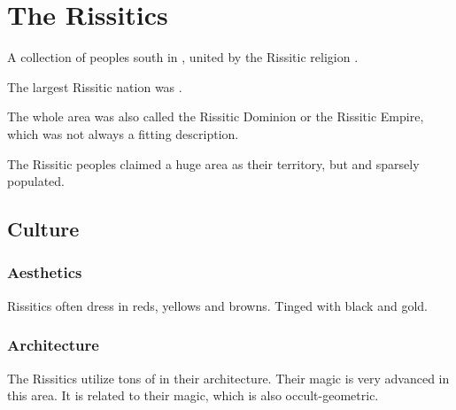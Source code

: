 \chapter{The Rissitics}
\index{\Durcac}
A collection of peoples south in , united by the Rissitic religion . 

The largest Rissitic nation was \Durcac. 

The whole area was also called the Rissitic Dominion or the Rissitic Empire, which was not always a fitting description.

The Rissitic peoples claimed a huge area as their territory, but  and sparsely populated. 















\section{Culture}









\subsection{Aesthetics}
Rissitics often dress in reds, yellows and browns. 
Tinged with black and gold.









\subsection{Architecture}
The Rissitics utilize tons of  in their architecture. 
Their magic is very advanced in this area. 
It is related to their  magic, which is also occult-geometric. 





